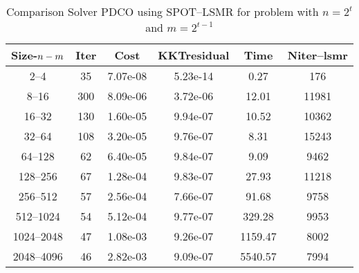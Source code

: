 \documentclass[letterpaper,12pt,oneside,final]{book}
\begin{document}
\begin{table}
\caption{Comparison Solver PDCO using SPOT--LSMR for  problem with $n=2^{t}$ and $m=2^{t-1}$} 
\begin{center}
\begin{tabular}{|*{6}{c}|} \hline
Size-$n\--m$ & \multicolumn{1}{c}{Iter} & \multicolumn{1}{c}{Cost} & \multicolumn{1}{c}{KKTresidual} & \multicolumn{1}{c}{Time} & \multicolumn{1}{c|}{Niter--lsmr} \\
\hline
%
2--4 &35&7.07e-08&5.23e-14& 0.27&176\\ 
8--16    &300& 8.09e-06& 3.72e-06& 12.01& 11981\\ 
16--32    &130& 1.60e-05& 9.94e-07& 10.52& 10362\\ 
32--64    &108& 3.20e-05& 9.76e-07& 8.31& 15243\\ 
64--128    &62& 6.40e-05& 9.84e-07& 9.09& 9462\\ 
128--256    &67& 1.28e-04& 9.83e-07& 27.93& 11218\\ 
256--512    &57& 2.56e-04& 7.66e-07& 91.68& 9758\\ 
512--1024    &54& 5.12e-04& 9.77e-07& 329.28& 9953\\ 
1024--2048    &47& 1.08e-03& 9.26e-07& 1159.47& 8002\\ 
2048--4096    &46& 2.82e-03& 9.09e-07& 5540.57& 7994\\ 



\end{tabular}
\end{center}
\end{table}
\end{document}
